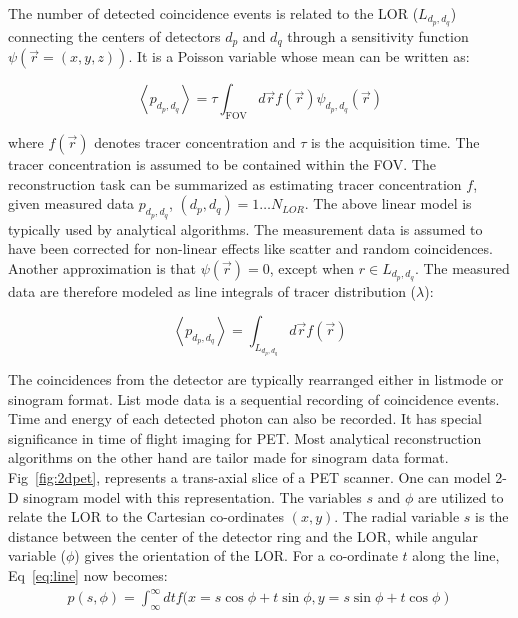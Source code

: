  The number of detected coincidence events is related to the \ac{LOR} ($L_{d_{p},d_{q}}$) connecting the centers of detectors $d_p$ and $d_q$ through a sensitivity function $\psi(\vec{r}=(x,y,z))$. It is a Poisson variable whose mean can be written as:

\begin{equation}\label{eq:analy}
\left\langle p_{d_{p},d_{q}}\right\rangle=\tau \int_{\mathrm{FOV}} d \vec{r} f(\vec{r}) \psi_{d_{p}, d_{q}}(\vec{r})
\end{equation}

where $f(\vec{r})$ denotes tracer concentration and $\tau$ is the acquisition time. The tracer concentration is assumed to be contained within the \ac{FOV}. The reconstruction task can be summarized as estimating tracer concentration $f$, given measured data $p_{d_{p},d_{q}}$, $(d_{p},d_{q})=1\dots N_{LOR}$. The above linear model is typically used by analytical algorithms. The measurement data is assumed to have been corrected for non-linear effects like scatter and random coincidences. Another approximation is that $\psi(\vec{r})=0$, except when $r\in L_{d_{p},d_{q}} $. The measured data are therefore modeled as line integrals of tracer distribution ($\lambda$): 

\begin{equation}
\label{eq:line}
\left\langle p_{d_{p}, d_{q}}\right\rangle=\int_{L_{d_{p}, d_{q}}} d \vec{r} f(\vec{r})
\end{equation}

The coincidences from the detector are typically rearranged either in listmode or sinogram format. List mode data is a sequential recording of coincidence events. Time and energy of each detected photon can also be recorded. It has special significance in time of flight imaging for \ac{PET}. Most analytical reconstruction algorithms on the other hand are tailor made for sinogram data format. Fig~\ref{fig:2dpet}, represents a trans-axial slice of a \ac{PET} scanner. One can model 2-D sinogram model with this representation. The variables $s$ and $\phi$ are utilized to relate the \ac{LOR} to the Cartesian co-ordinates $(x,y)$. The radial variable $s$ is the distance between the center of the detector ring and the \ac{LOR}, while angular variable ($\phi$) gives the orientation of the \ac{LOR}. 
For a co-ordinate $t$ along the line, Eq~\ref{eq:line} now becomes:
\begin{equation}\label{eq:line_sino}
\begin{array}{c}
p\left(s, \phi\right)=\int_{\infty}^{\infty} d t f(x= s \cos\phi +t \sin \phi, 
\left.y=s \sin \phi + t \cos \phi\right)
\end{array}
\end{equation}


